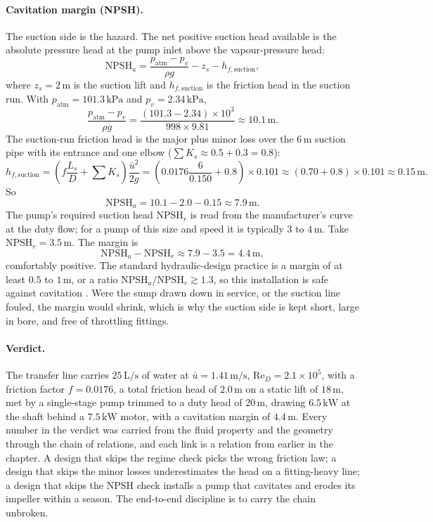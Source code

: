 \paragraph{Cavitation margin (NPSH).} The suction side is the
hazard. The net positive suction head available is the absolute
pressure head at the pump inlet above the vapour-pressure head:
\[
\text{NPSH}_a = \frac{p_{\text{atm}} - p_v}{\rho g} - z_s -
h_{f,\text{suction}},
\]
where $z_s = 2\,\si{\meter}$ is the suction lift and
$h_{f,\text{suction}}$ is the friction head in the suction run. With
$p_{\text{atm}} = 101.3\,\si{\kilo\pascal}$ and $p_v = 2.34\,\si{
\kilo\pascal}$,
\[
\frac{p_{\text{atm}} - p_v}{\rho g} = \frac{(101.3 - 2.34)\times10^3}{
998\times9.81} \approx 10.1\,\si{\meter}.
\]
The suction-run friction head is the major plus minor loss over the
$6\,\si{\meter}$ suction pipe with its entrance and one elbow
($\sum K_s \approx 0.5 + 0.3 = 0.8$):
\[
h_{f,\text{suction}} = \left(f\frac{L_s}{D} + \sum K_s\right)\frac{
\bar u^2}{2g} = \left(0.0176\frac{6}{0.150} + 0.8\right)\times0.101
\approx (0.70 + 0.8)\times0.101 \approx 0.15\,\si{\meter}.
\]
So
\[
\text{NPSH}_a = 10.1 - 2.0 - 0.15 \approx 7.9\,\si{\meter}.
\]
The pump's required suction head $\text{NPSH}_r$ is read from the
manufacturer's curve at the duty flow; for a pump of this size and
speed it is typically $3$ to $4\,\si{\meter}$. Take $\text{NPSH}_r =
3.5\,\si{\meter}$. The margin is
\[
\text{NPSH}_a - \text{NPSH}_r \approx 7.9 - 3.5 = 4.4\,\si{\meter},
\]
comfortably positive. The standard hydraulic-design practice is a
margin of at least $0.5$ to $1\,\si{\meter}$, or a ratio
$\text{NPSH}_a/\text{NPSH}_r \gtrsim 1.3$, so this installation is
safe against cavitation \cite{text:ch02t3-karassik-pumps}. Were the
sump drawn down in service, or the suction line fouled, the margin
would shrink, which is why the suction side is kept short, large in
bore, and free of throttling fittings.

\paragraph{Verdict.} The transfer line carries $25\,\si{\liter\per
\second}$ of water at $\bar u = 1.41\,\si{\meter\per\second}$,
$\text{Re}_D = 2.1\times10^5$, with a friction factor $f = 0.0176$, a
total friction head of $2.0\,\si{\meter}$ on a static lift of
$18\,\si{\meter}$, met by a single-stage pump trimmed to a duty head
of $20\,\si{\meter}$, drawing $6.5\,\si{\kilo\watt}$ at the shaft
behind a $7.5\,\si{\kilo\watt}$ motor, with a cavitation margin of
$4.4\,\si{\meter}$. Every number in the verdict was carried from the
fluid property and the geometry through the chain of relations, and
each link is a relation from earlier in the chapter. A design that
skips the regime check picks the wrong friction law; a design that
skips the minor losses underestimates the head on a fitting-heavy
line; a design that skips the NPSH check installs a pump that
cavitates and erodes its impeller within a season. The end-to-end
discipline is to carry the chain unbroken.

